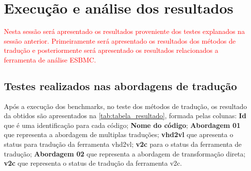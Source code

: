 \par 

\par 


\section{Execução e análise dos resultados}

\textcolor{red}{Nesta sessão será apresentado os resultados proveniente dos testes explanados na sessão anterior. Primeiramente será apresentado os resultados dos métodos de tradução e posteriormente será apresentado os resultados relacionados a ferramenta de análise ESBMC.}

\subsection{Testes realizados nas abordagens de tradução}

Após a execução dos benchmarks, no teste dos métodos de tradução, os
resultado da obtidos são apresentados na \autoref{tab:tabela_resultado}, formada pelas colunas: \textbf{Id} que é uma identificação para cada código; \textbf{Nome do código}; \textbf{Abordagem 01} que representa a abordagem de multiplas traduções; \textbf{vhd2vl} que apresenta o status para tradução da ferramenta vhd2vl; \textbf{v2c} para o status da ferramenta de tradução; \textbf{Abordagem 02} que representa a abordagem de transformação direta; \textbf{v2c} que representa o status de tradução da ferramenta v2c.

